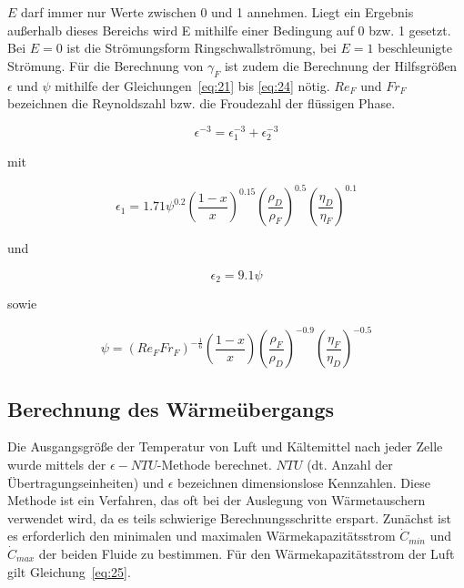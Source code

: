 $E$ darf immer nur Werte zwischen 0 und 1 annehmen. Liegt ein Ergebnis außerhalb dieses Bereichs wird E mithilfe einer Bedingung auf 0 bzw. 1 gesetzt. Bei $E=0$ ist die Strömungsform Ringschwallströmung, bei $E=1$ beschleunigte Strömung.
Für die Berechnung von $\gamma_F$ ist zudem die Berechnung der Hilfsgrößen $\epsilon$ und $\psi$ mithilfe der Gleichungen~\ref{eq:21} bis \ref{eq:24} nötig. $Re_F$ und $Fr_F$ bezeichnen die Reynoldszahl bzw. die Froudezahl der flüssigen Phase.

\begin{equation}
\label{eq:21}
\epsilon^{-3} = \epsilon_1^{-3} + \epsilon_2^{-3}
\end{equation}

mit

\begin{equation}
\label{eq:22}
\epsilon_1 = 1.71 \psi^{0.2} \left( \frac{1-x}{x} \right)^{0.15} \left( \frac{\rho_D}{\rho_F} \right)^{0.5} \left( \frac{\eta_D}{\eta_F} \right)^{0.1}
\end{equation}

und

\begin{equation}
\label{eq:23}
\epsilon_2 = 9.1 \psi
\end{equation}

\clearpage

sowie

\begin{equation}
\label{eq:24}
\psi = (Re_F Fr_F)^{-\frac{1}{6}} \left( \frac{1-x}{x} \right) \left(\frac{\rho_F}{\rho_D} \right)^{-0.9} \left(\frac{\eta_F}{\eta_D} \right)^{-0.5}
\end{equation}

\subsection{Berechnung des Wärmeübergangs}
\label{subsec:Berechnung des Wärmeübergangs}

Die Ausgangsgröße der Temperatur von Luft und Kältemittel nach jeder Zelle wurde mittels der $\epsilon-NTU$-Methode berechnet\cite{SpringerVerlagGmbH.2013}\cite{Bergman.2011}\cite{Nellis.2009}. $NTU$ (dt. Anzahl der Übertragungseinheiten) und $\epsilon$ bezeichnen dimensionslose Kennzahlen. Diese Methode ist ein Verfahren, das oft bei der Auslegung von Wärmetauschern verwendet wird, da es teils schwierige Berechnungsschritte erspart. Zunächst ist es erforderlich den minimalen und maximalen Wärmekapazitätsstrom $\dot{C}_{min}$ und $\dot{C}_{max}$ der beiden Fluide zu bestimmen.
Für den Wärmekapazitätsstrom der Luft gilt Gleichung~\ref{eq:25}.

